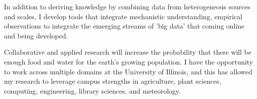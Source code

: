 \documentclass[english]{tufte-handout}
\begin{document}
\begin{fullwidth}
 In addition to deriving knowledge by combining data from heterogeneous sources and scales, I develop tools that integrate mechanistic understanding, empirical observations to integrate the emerging streams of 'big data' that coming online and being developed. 

 Collaborative and applied research will increase the probability that there will be enough food and water for the earth's growing population. 
 I have the opportunity to work across multiple domains at the University of Illinois, and this has allowed my research to leverage campus strengths in agriculture, plant sciences, computing, engineering, library sciences, and meteorology. 

\end{fullwidth}
\end{document}
